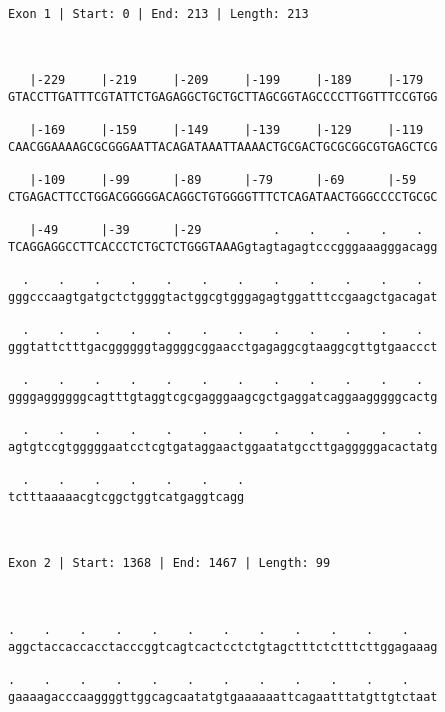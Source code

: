 \documentclass{article}
\begin{document}
 \begin{Verbatim}
 
Exon 1 | Start: 0 | End: 213 | Length: 213



   |-229     |-219     |-209     |-199     |-189     |-179  
GTACCTTGATTTCGTATTCTGAGAGGCTGCTGCTTAGCGGTAGCCCCTTGGTTTCCGTGG
                                                            
   |-169     |-159     |-149     |-139     |-129     |-119  
CAACGGAAAAGCGCGGGAATTACAGATAAATTAAAACTGCGACTGCGCGGCGTGAGCTCG
                                                            
   |-109     |-99      |-89      |-79      |-69      |-59   
CTGAGACTTCCTGGACGGGGGACAGGCTGTGGGGTTTCTCAGATAACTGGGCCCCTGCGC
                                                            
   |-49      |-39      |-29          .    .    .    .    .  
TCAGGAGGCCTTCACCCTCTGCTCTGGGTAAAGgtagtagagtcccgggaaagggacagg
                                                            
  .    .    .    .    .    .    .    .    .    .    .    .  
gggcccaagtgatgctctggggtactggcgtgggagagtggatttccgaagctgacagat
                                                            
  .    .    .    .    .    .    .    .    .    .    .    .  
gggtattctttgacggggggtaggggcggaacctgagaggcgtaaggcgttgtgaaccct
                                                            
  .    .    .    .    .    .    .    .    .    .    .    .  
ggggaggggggcagtttgtaggtcgcgagggaagcgctgaggatcaggaagggggcactg
                                                            
  .    .    .    .    .    .    .    .    .    .    .    .  
agtgtccgtgggggaatcctcgtgataggaactggaatatgccttgagggggacactatg
                                                            
  .    .    .    .    .    .    .
tctttaaaaacgtcggctggtcatgaggtcagg
                                 
                                 
 
Exon 2 | Start: 1368 | End: 1467 | Length: 99



.    .    .    .    .    .    .    .    .    .    .    .    
aggctaccaccacctacccggtcagtcactcctctgtagctttctctttcttggagaaag
                                                            
.    .    .    .    .    .    .    .    .    .    .    .    
gaaaagacccaaggggttggcagcaatatgtgaaaaaattcagaatttatgttgtctaat
                                                            

\end{Verbatim}
\end{document}

